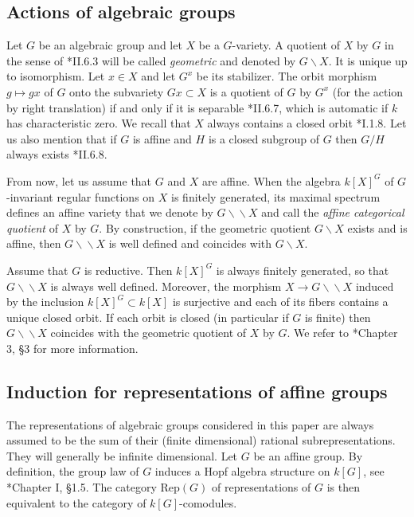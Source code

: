 \documentclass{amsart}
\theoremstyle{definition}
\newcommand{\dquo}{\backslash \!\! \backslash}
\begin{document}
\subsection{Actions of algebraic groups} \label{quotients}

Let $G$ be an algebraic group and let $X$ be a $G$-variety. A quotient of $X$ by $G$ in the sense of \cite{Borel}*{II.6.3} will be called \textit{geometric} and denoted by $G\backslash X$. It is unique up to isomorphism. Let $x \in X$ and let $G^x$ be its stabilizer. The orbit morphism $g \mapsto gx$ of $G$ onto the subvariety $Gx \subset X$ is a quotient of $G$ by $G^x$ (for the action by right translation) if and only if it is separable \cite{Borel}*{II.6.7}, which is automatic if $k$ has characteristic zero. We recall that $X$ always contains a closed orbit \cite{Borel}*{I.1.8}. Let us also mention that if $G$ is affine and $H$ is a closed subgroup of $G$ then $G/H$ always exists \cite{Borel}*{II.6.8}.

From now, let us assume that $G$ and $X$ are affine. When the algebra $k[X]^G$ of $G$-invariant regular functions on $X$ is finitely generated, its maximal spectrum defines an affine variety that we denote by $G \backslash \!\! \backslash X$ and call the \textit{affine categorical quotient} of $X$ by $G$. By construction, if the geometric quotient $G\backslash X$ exists and is affine, then $G\backslash \!\! \backslash X$ is well defined and coincides with $G \backslash X$.

Assume that $G$ is reductive. Then $k[X]^G$ is always finitely generated, so that $G \backslash \!\! \backslash X$ is always well defined. Moreover, the morphism $X \to G\dquo X$ induced by the inclusion $k[X]^G \subset k[X]$ is surjective and each of its fibers contains a unique closed orbit. If each orbit is closed (in particular if $G$ is finite) then $G\dquo X$ coincides with the geometric quotient of $X$ by $G$. We refer to \cite{Newstead}*{Chapter 3, §3} for more information.

\subsection{Induction for representations of affine groups}

The representations of algebraic groups considered in this paper are always assumed to be the sum of their (finite dimensional) rational subrepresentations. They will generally be infinite dimensional. Let $G$ be an affine group. By definition, the group law of $G$ induces a Hopf algebra structure on $k[G]$, see \cite{Borel}*{Chapter I, §1.5}. The category $\mathrm{Rep}(G)$ of representations of $G$ is then equivalent to the category of $k[G]$-comodules.
\end{document}

